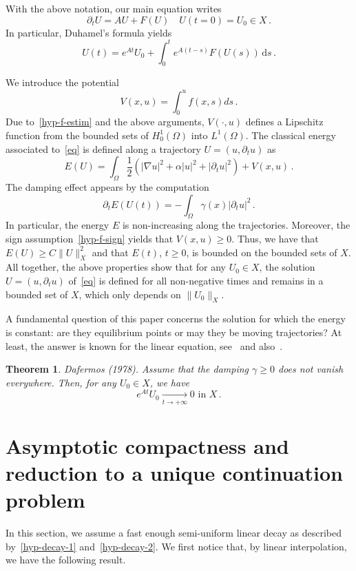 \documentclass[11pt]{article}
\newtheorem{theo}{Theorem}[section]
\theoremstyle{definition}
\numberwithin{equation}{section}
\numberwithin{figure}{section}
\numberwithin{table}{section}
\newcommand{\drm}{\mathrm{d}}
\newcommand{\grad}{\nabla}
\begin{document}
With the above notation, our main equation writes
\begin{equation}\label{eq2}
\partial_t U=AU + F(U)\quad U(t=0)=U_0\in X\,.
\end{equation}
In particular, Duhamel's formula yields
\[
U(t)=e^{At}U_0 + \int_0^t e^{A(t-s)}F(U(s))\,\drm s\,.
\]

We introduce the potential
\[
V(x,u)=\int_0^u f(x,s)ds\,.
\]
Due to~\eqref{hyp-f-estim} and the above arguments, $V(\cdot,u)$ defines a Lipschitz function from the bounded sets of $H^1_0(\Omega)$ into $L^1(\Omega)$. The classical energy associated to~\eqref{eq} is defined along a trajectory $U=(u,\partial_t u)$ as
\[
E(U)= \int_\Omega \frac12\left(|\grad u|^2+\alpha |u|^2+|\partial_t u|^2\right) +
V(x,u)\,.
\]
The damping effect appears by the computation
\begin{equation}\label{eq-deriv-E}
\partial_t E(U(t))= - \int_\Omega \gamma(x)|\partial_t u |^2\,.
\end{equation}
In particular, the energy $E$ is non-increasing along the trajectories. Moreover, the sign assumption~\eqref{hyp-f-sign} yields that $V(x,u)\geq 0$. Thus, we have that $E(U)\geq C \|U\|_X^2$ and that $E(t)$, $t\geq 0$, is bounded on the bounded sets of $X$. All together, the above properties show that for any $U_0\in X$, the solution $U=(u,\partial_t u)$ of~\eqref{eq} is defined for all non-negative times and remains in a bounded set of $X$, which only depends on $\|U_0\|_X$.

A fundamental question of this paper concerns the solution for which the energy is constant: are they equilibrium points or may they be moving trajectories? At least, the answer is known for the linear equation, see~\cite{Dafermos} and also~\cite{Haraux}.

\begin{theo}\label{th-stab-linear}
\emph{Dafermos (1978).}
Assume that the damping $\gamma\geq 0$ does not vanish everywhere. Then, for any $U_0\in X$, we have
\[
e^{At}U_0\xrightarrow[t\longrightarrow +\infty]{} 0\text{ in }X\,.
\]
\end{theo}



\section{Asymptotic compactness and reduction to a unique continuation problem}\label{section-asymp-compact}

In this section, we assume a fast enough semi-uniform linear decay as described by~\eqref{hyp-decay-1} and~\eqref{hyp-decay-2}. We first notice that, by linear interpolation, we have the following result.
\end{document}
